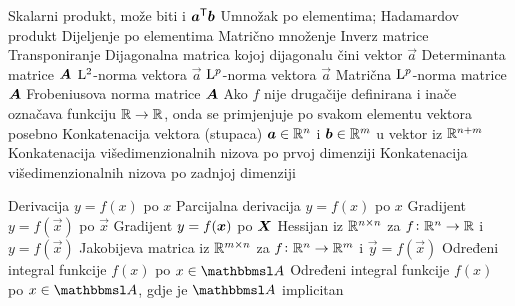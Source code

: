  {} 
	{Skalarni produkt, može biti i $\vec{a}^\tp\vec{b}$}
	{Umnožak po elementima; Hadamardov produkt}
	{Dijeljenje po elementima}
	{Matrično množenje}
	{Inverz matrice}
	{Transponiranje}
	{Dijagonalna matrica kojoj dijagonalu čini vektor $\vec a$}
	{Determinanta matrice $\mat A$}
	{$\mathrm{L}^2$-norma vektora $\vec a$}
	{$\mathrm{L}^p$-norma vektora $\vec a$}
	{Matrična $\mathrm{L}^p$-norma matrice $\mat A$}
	{Frobeniusova norma matrice $\mat A$}
	{Ako $f$ nije drugačije definirana i inače označava funkciju $\mathbb{R}\to\mathbb{R}$, onda se primjenjuje po svakom elementu vektora posebno}
	{Konkatenacija vektora (stupaca) $\vec a\in\R^n$ i $\vec b\in\R^m$ u vektor iz $\mathbb{R}^{n+m}$}
	{Konkatenacija višedimenzionalnih nizova po prvoj dimenziji}
	{Konkatenacija višedimenzionalnih nizova po zadnjoj dimenziji}

	{Derivacija $y=f(x)$ po $x$}
	{Parcijalna derivacija $y=f(x)$ po $x$}
	{Gradijent $y=f(\vec x)$ po $\vec x$}
	{Gradijent $y=f(\mat x)$ po $\mat X$}
	{Hessijan iz $\mathbb{R}^{n\times n}$ za $f \colon \mathbb{R}^n \to \mathbb{R}$ i $y=f(\vec x)$}
	{Jakobijeva matrica iz $\mathbb{R}^{m\times n}$ za $f \colon \mathbb{R}^n \to \mathbb{R}^m$ i $\vec y=f(\vec x)$}
	{Određeni integral funkcije $f(x)$ po $x\in\set A$}
	{Određeni integral funkcije $f(x)$ po $x\in\set A$, gdje je $\set A$ implicitan}

